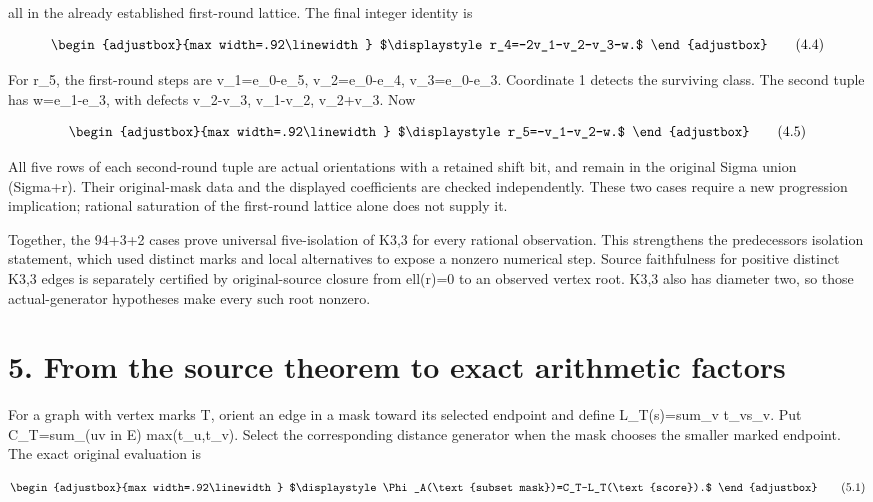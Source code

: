 all in the already established first-round lattice. The final integer identity is

\[
\begin{adjustbox}{max width=.92\linewidth}
$\displaystyle r_4=-2v_1-v_2-v_3-w.$
\end{adjustbox}
\tag{4.4}
\]

For r\_5, the first-round steps are v\_1=e\_0-e\_5, v\_2=e\_0-e\_4, v\_3=e\_0-e\_3. Coordinate 1 detects the surviving class. The second tuple has w=e\_1-e\_3, with defects v\_2-v\_3, v\_1-v\_2, v\_2+v\_3. Now

\[
\begin{adjustbox}{max width=.92\linewidth}
$\displaystyle r_5=-v_1-v_2-w.$
\end{adjustbox}
\tag{4.5}
\]

All five rows of each second-round tuple are actual orientations with a retained shift bit, and remain in the original Sigma union (Sigma+r). Their original-mask data and the displayed coefficients are checked independently. These two cases require a new progression implication; rational saturation of the first-round lattice alone does not supply it.

Together, the 94+3+2 cases prove universal five-isolation of K3,3 for every rational observation. This strengthens the predecessor\textquotesingle s isolation statement, which used distinct marks and local alternatives to expose a nonzero numerical step. Source faithfulness for positive distinct K3,3 edges is separately certified by original-source closure from ell(r)=0 to an observed vertex root. K3,3 also has diameter two, so those actual-generator hypotheses make every such root nonzero.

\section{5. From the source theorem to exact arithmetic factors}\label{n18-from-the-source-theorem-to-exact-arithmetic-factors}

For a graph with vertex marks T, orient an edge in a mask toward its selected endpoint and define L\_T(s)=sum\_v t\_vs\_v. Put C\_T=sum\_(uv in E) max(t\_u,t\_v). Select the corresponding distance generator when the mask chooses the smaller marked endpoint. The exact original evaluation is

\[
\begin{adjustbox}{max width=.92\linewidth}
$\displaystyle \Phi_A(\text{subset mask})=C_T-L_T(\text{score}).$
\end{adjustbox}
\tag{5.1}
\]

